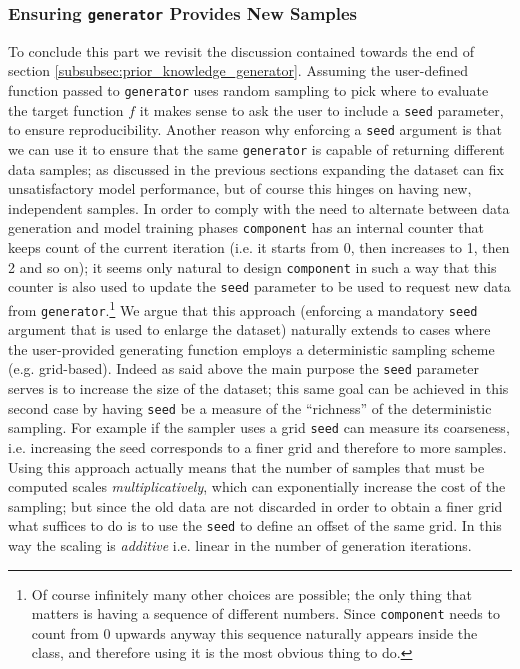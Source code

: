 \subsubsection{Ensuring \texttt{generator} Provides New Samples}
To conclude this part we revisit the discussion contained towards the end of section \ref{subsubsec:prior_knowledge_generator}. 
Assuming the user-defined function passed to \texttt{generator} uses random sampling to pick where to evaluate the target function $f$ it makes sense to ask the user to include a \texttt{seed} parameter, to ensure reproducibility. Another reason why enforcing a \texttt{seed} argument is that we can use it to ensure that the same \texttt{generator} is capable of returning different data samples; as discussed in the previous sections expanding the dataset can fix unsatisfactory model performance, but of course this hinges on having new, independent samples.
In order to comply with the need to alternate between data generation and model training phases \texttt{component} has an internal counter that keeps count of the current iteration (i.e. it starts from 0, then increases to 1, then 2 and so on); it seems only natural to design \texttt{component} in such a way that this counter is also used to update the \texttt{seed} parameter to be used to request new data from \texttt{generator}.\footnote{Of course infinitely many other choices are possible; the only thing that matters is having a sequence of different numbers. Since \texttt{component} needs to count from 0 upwards anyway this sequence naturally appears inside the class, and therefore using it is the most obvious thing to do.}
We argue that this approach (enforcing a mandatory \texttt{seed} argument that is used to enlarge the dataset) naturally extends to cases where the user-provided generating function employs a deterministic sampling scheme (e.g. grid-based). Indeed as said above the main purpose the \texttt{seed} parameter serves is to increase the size of the dataset; this same goal can be achieved in this second case by having \texttt{seed} be a measure of the ``richness'' of the deterministic sampling. For example if the sampler uses a grid \texttt{seed} can measure its coarseness, i.e. increasing the seed corresponds to a finer grid and therefore to more samples. Using this approach actually means that the number of samples that must be computed scales \emph{multiplicatively}, which can exponentially increase the cost of the sampling; but since the old data are not discarded in order to obtain a finer grid what suffices to do is to use the \texttt{seed} to define an offset of the same grid. In this way the scaling is \emph{additive} i.e. linear in the number of generation iterations.

